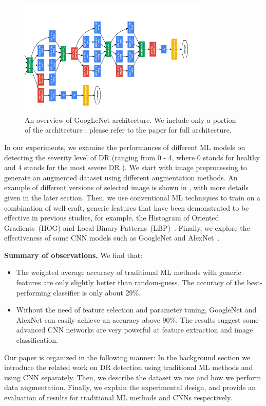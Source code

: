 \begin{figure}
\centering
\includegraphics[width=0.8\textwidth]{googlenet_arch.png}
\caption{An overview of GoogLeNet architecture. We include only a portion of the architecture ; please refer to the paper for full architecture.}
\label{googlenet_arch}
\end{figure}

In our experiments, we examine the performances of different ML models on detecting the severity level of DR (ranging from 0 - 4, where 0 stands for healthy and 4 stands for the most severe DR ). We start with image preprocessing to generate an augmented dataset using different augmentation methods. An example of different versions of selected image is shown in , with more details given in the later section. Then, we use conventional ML techniques to train on a combination of well-craft, generic features that have been demonstrated to be effective in previous studies, for example, the Histogram of Oriented Gradients~(HOG) and Local Binary Patterns~(LBP)~\cite{hog,lbp}. Finally, we explore the effectiveness of some CNN models such as GoogleNet and AlexNet~\cite{GoogleNet,AlexNet}. 

\textbf{Summary of observations.} We find that: 
\begin{itemize}
\item The weighted average accuracy of traditional ML methods with generic features are only slightly better than random-guess. The accuracy of the best-performing classifier is only about 29\%.
\item Without the need of feature selection and parameter tuning, GoogleNet and AlexNet can easily achieve an accuracy above 90\%. The results suggest some advanced CNN networks are very powerful at feature extraction and image classification. 
\end{itemize}

Our paper is organized in the following manner: In the background 
section we introduce the related work on DR detection using 
traditional ML methods and using CNN separately. Then, we describe the dataset we use and how we perform data augmentation. Finally, we explain the experimental 
design, and provide an evaluation of results for traditional ML methods and CNNs respectively. 


